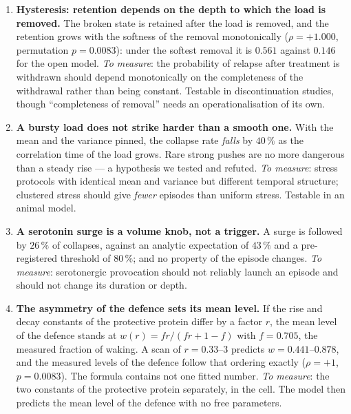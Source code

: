 \begin{enumerate}[leftmargin=1.5em,itemsep=4pt]
\item \textbf{Hysteresis: retention depends on the depth to which the load is removed.} The broken state is retained after the load is removed, and the retention grows with the softness of the removal monotonically ($\rho=+1.000$, permutation $p=0.0083$): under the softest removal it is $0.561$ against $0.146$ for the open model. \emph{To measure}: the probability of relapse after treatment is withdrawn should depend monotonically on the completeness of the withdrawal rather than being constant. Testable in discontinuation studies, though ``completeness of removal'' needs an operationalisation of its own.

\item \textbf{A bursty load does not strike harder than a smooth one.} With the mean and the variance pinned, the collapse rate \emph{falls} by $40\,\%$ as the correlation time of the load grows. Rare strong pushes are no more dangerous than a steady rise --- a hypothesis we tested and refuted. \emph{To measure}: stress protocols with identical mean and variance but different temporal structure; clustered stress should give \emph{fewer} episodes than uniform stress. Testable in an animal model.

\item \textbf{A serotonin surge is a volume knob, not a trigger.} A surge is followed by $26\,\%$ of collapses, against an analytic expectation of $43\,\%$ and a pre-registered threshold of $80\,\%$; and no property of the episode changes. \emph{To measure}: serotonergic provocation should not reliably launch an episode and should not change its duration or depth.

\item \textbf{The asymmetry of the defence sets its mean level.} If the rise and decay constants of the protective protein differ by a factor $r$, the mean level of the defence stands at $w(r)=fr/(fr+1-f)$ with $f=0.705$, the measured fraction of waking. A scan of $r=0.33$--$3$ predicts $w=0.441$--$0.878$, and the measured levels of the defence follow that ordering exactly ($\rho=+1$, $p=0.0083$). The formula contains not one fitted number. \emph{To measure}: the two constants of the protective protein separately, in the cell. The model then predicts the mean level of the defence with no free parameters.


\end{enumerate}
